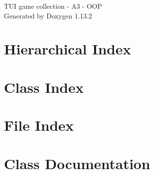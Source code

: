 \documentclass[twoside]{book}
\newcommand{\+}{\discretionary{\mbox{\scriptsize$\hookleftarrow$}}{}{}}
\newcommand{\clearemptydoublepage}{%
    \newpage{\pagestyle{empty}\cleardoublepage}%
  }
\begin{document}
  \raggedbottom
    \hypersetup{pageanchor=false,
                bookmarksnumbered=true,
                pdfencoding=unicode
               }
  \begin{titlepage}
  \vspace*{7cm}
  \begin{center}%
  {\Large TUI game collection -\/ A3 -\/ OOP}\\
  \vspace*{1cm}
  {\large Generated by Doxygen 1.13.2}\\
  \end{center}
  \end{titlepage}
  \clearemptydoublepage
  \tableofcontents
  \clearemptydoublepage
  \hypersetup{pageanchor=true}

\chapter{Hierarchical Index}

\chapter{Class Index}

\chapter{File Index}

\chapter{Class Documentation}











































\end{document}
